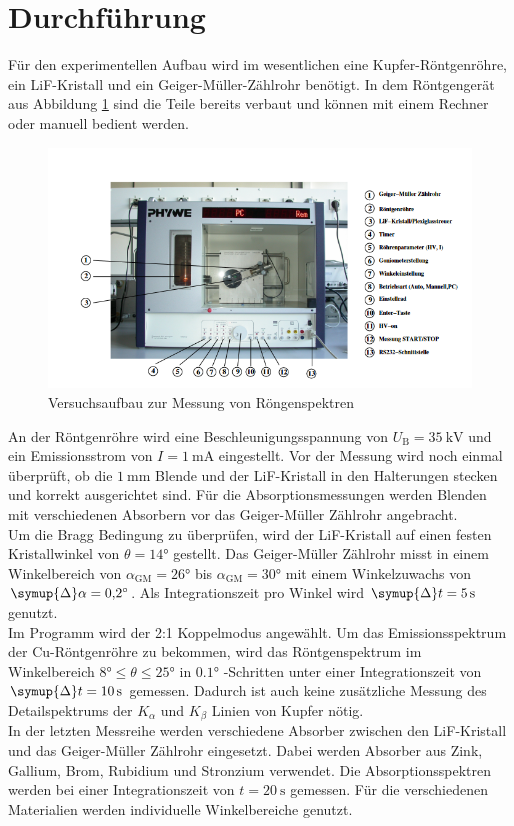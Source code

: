 \section{Durchführung}
Für den experimentellen Aufbau wird im wesentlichen eine Kupfer-Röntgenröhre, ein LiF-Kristall und ein Geiger-Müller-Zählrohr benötigt. In dem Röntgengerät aus Abbildung \ref{fig:aufbau}
sind die Teile bereits verbaut und können mit einem Rechner oder manuell bedient werden.
\begin{figure}
    \centering
    \caption{Versuchsaufbau zur Messung von Röngenspektren \cite{V602}}
    \label{fig:aufbau}
    \includegraphics[width = 0.6 \textwidth]{pics/gerät.png}
\end{figure}
An der Röntgenröhre wird eine Beschleunigungsspannung von $U_\text{B}=\SI{35}{\kilo \volt}$ und ein Emissionsstrom von $I=\SI{1}{\milli\ampere}$ eingestellt.
Vor der Messung wird noch einmal überprüft, ob die $\SI{1}{\milli\metre}$ Blende und der LiF-Kristall in den Halterungen stecken und korrekt ausgerichtet sind.
Für die Absorptionsmessungen werden Blenden mit verschiedenen Absorbern vor das Geiger-Müller Zählrohr angebracht.
\\
Um die Bragg Bedingung zu überprüfen, wird der LiF-Kristall auf einen festen Kristallwinkel von $\theta=\ang{14;;}$ gestellt. Das Geiger-Müller Zählrohr misst in einem Winkelbereich von 
$\alpha_\text{GM}=\ang{26;;} $ bis $\alpha_\text{GM}=\ang{30;;} $ mit einem Winkelzuwachs von $\symup{\Delta} \alpha =\ang{0.2;;}$. Als Integrationszeit pro Winkel wird 
$\symup{\Delta}t=\SI{5}{\second}$ genutzt.
\\
Im Programm wird der 2:1 Koppelmodus angewählt.
Um das Emissionsspektrum der Cu-Röntgenröhre zu bekommen, wird das Röntgenspektrum im Winkelbereich $\ang{8;;} \leq \theta \leq \ang{25;;}$ in $\ang{0.1;;}$
-Schritten unter einer Integrationszeit von $\symup{\Delta}t=\SI{10}{\second}$ gemessen. Dadurch ist auch keine zusätzliche Messung des Detailspektrums der $K_\alpha$
und $K_\beta$ Linien von Kupfer nötig.
\\
In der letzten Messreihe werden verschiedene Absorber zwischen den LiF-Kristall und das Geiger-Müller Zählrohr eingesetzt. Dabei werden Absorber aus Zink, Gallium, Brom, Rubidium und Stronzium verwendet.
Die Absorptionsspektren werden bei einer Integrationszeit von $t=\SI{20}{\second}$ gemessen. Für die verschiedenen Materialien werden individuelle Winkelbereiche genutzt.